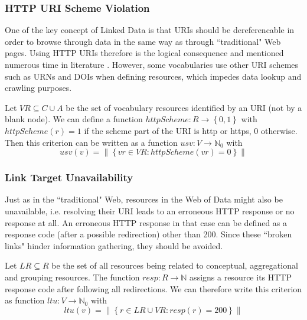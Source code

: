 
\subsubsection{HTTP URI Scheme Violation} One of the key concept of Linked Data is that URIs should be dereferencable in order to browse through data in the same way as through ``traditional" Web pages. Using HTTP URIs therefore is the logical consequence and mentioned numerous time in literature \cite{Heath2011}. However, some vocabularies use other URI schemes such as URNs and DOIs when defining resources, which impedes data lookup and crawling purposes.

\begin{definition}
Let \(VR \subseteq C \cup A\) be the set of vocabulary resources identified by an URI (not by a blank node). We can define a function \(httpScheme:R \rightarrow \left\{0,1\right\}\) with \(httpScheme(r)=1\) if the scheme part of the URI is http or https, 0 otherwise. Then this criterion can be written as a function \(usv:V \rightarrow \mathbb{N}_{0}\) with \[usv(v)=\left\|\left\{vr \in VR : httpScheme(vr)=0\right\}\right\|\]
\end{definition}

\subsubsection{Link Target Unavailability} Just as in the ``traditional" Web, resources in the Web of Data might also be unavailable, i.e. resolving their URI leads to an erroneous HTTP response or no response at all. An erroneous HTTP response in that case can be defined as a response code (after a possible redirection) other than 200. Since these ``broken links" hinder information gathering, they should be avoided.

\begin{definition}
Let \(LR \subseteq R\) be the set of all resources being related to conceptual, aggregational and grouping resources. The function \(resp:R \rightarrow \mathbb{N}\) assigns a resource its HTTP response code after following all redirections. We can therefore write this criterion as function \(ltu:V \rightarrow \mathbb{N}_{0}\) with \[ltu(v)=\left\|\left\{r \in LR \cup VR : resp(r)=200\right\}\right\|\]
\end{definition}

